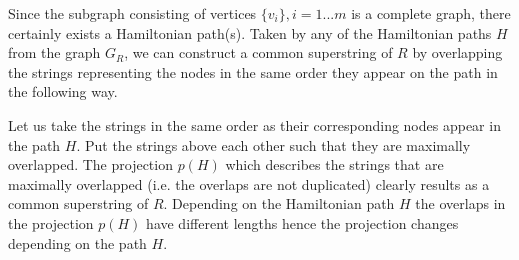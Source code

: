 \documentclass[english,twoside,censored,csm,algorithms-track-2020]{HYthesisML}
\theoremstyle{plain}
\theoremstyle{definition}
\begin{document}

Since the subgraph consisting of vertices $\{v_i\}, i=1...m$ is a complete graph, there certainly exists a
Hamiltonian path(s). Taken by any
of the Hamiltonian paths $H$ from the graph $G_R$, we can construct a common superstring of $R$ by
overlapping the strings representing the nodes in the same order they appear on the path in the
following way.

Let us take the strings in the same order as their corresponding nodes appear in the path $H$. Put the
strings above each other such that they are maximally overlapped. The projection $p(H)$ which describes
the strings that are maximally overlapped (i.e. the overlaps are not duplicated) clearly results as a
common superstring of $R$. Depending on the Hamiltonian path $H$ the overlaps in the
projection $p(H)$ have different lengths hence the projection changes depending on the path $H$. 
\end{document}
